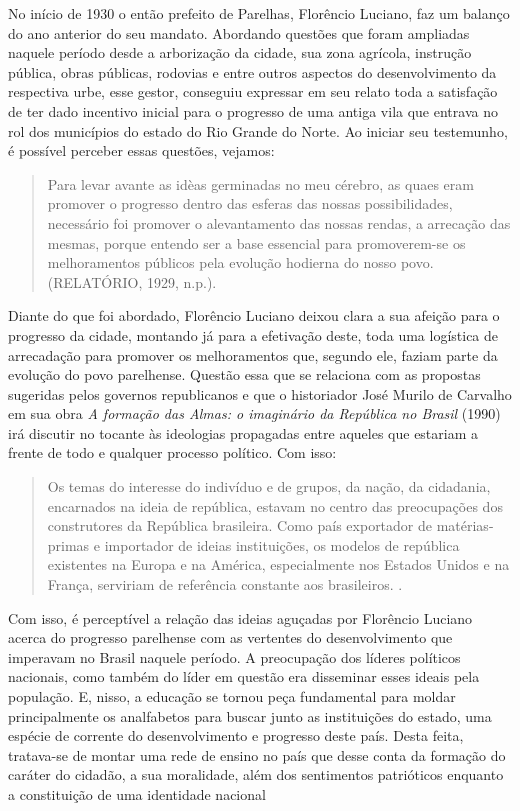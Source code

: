 \begin{refsection}
No início de 1930 o então prefeito de Parelhas, Florêncio Luciano, faz um balanço do ano anterior do seu mandato. Abordando questões que foram ampliadas naquele período desde a arborização da cidade, sua zona agrícola, instrução pública, obras públicas, rodovias e entre outros aspectos do desenvolvimento da respectiva urbe, esse gestor, conseguiu expressar em seu relato toda a satisfação de ter dado incentivo inicial para o progresso de uma antiga vila que entrava no rol dos municípios do estado do Rio Grande do Norte. Ao iniciar seu testemunho, é possível perceber essas questões, vejamos: 

\begin{quotation}
    Para levar avante as idèas germinadas no meu cérebro, as quaes eram promover o progresso dentro das esferas das nossas possibilidades, necessário foi promover o alevantamento das nossas rendas, a arrecação das mesmas, porque entendo ser a base essencial para promoverem-se os melhoramentos públicos pela evolução hodierna do nosso povo. (RELATÓRIO, 1929, n.p.).
\end{quotation}

Diante do que foi abordado, Florêncio Luciano deixou clara a sua afeição para o progresso da cidade, montando já para a efetivação deste, toda uma logística de arrecadação para promover os melhoramentos que, segundo ele, faziam parte da evolução do povo parelhense. Questão essa que se relaciona com as propostas sugeridas pelos governos republicanos e que o historiador José Murilo de Carvalho em sua obra \textit{A formação das Almas: o imaginário da República no Brasil} (1990) irá discutir no tocante às ideologias propagadas entre aqueles que estariam a frente de todo e qualquer processo político. Com isso:

\begin{quotation}
    Os temas do interesse do indivíduo e de grupos, da nação, da cidadania, encarnados na ideia de república, estavam no centro das preocupações dos construtores da República brasileira. Como país exportador de matérias-primas e importador de ideias instituições, os modelos de república existentes na Europa e na América, especialmente nos Estados Unidos e na França, serviriam de referência constante aos brasileiros. \cite[p.~18]{Carvalho1990Formacao}.
\end{quotation}

Com isso, é perceptível a relação das ideias aguçadas por Florêncio Luciano acerca do progresso parelhense com as vertentes do desenvolvimento que imperavam no Brasil naquele período. A preocupação dos líderes políticos nacionais, como também do líder em questão era disseminar esses ideais pela população. E, nisso, a educação se tornou peça fundamental para moldar principalmente os analfabetos para buscar junto as instituições do estado, uma espécie de corrente do desenvolvimento e progresso deste país. Desta feita, tratava-se de montar uma rede de ensino no país que desse conta da formação do caráter do cidadão, a sua moralidade, além dos sentimentos patrióticos enquanto a constituição de uma identidade nacional


\end{refsection}
